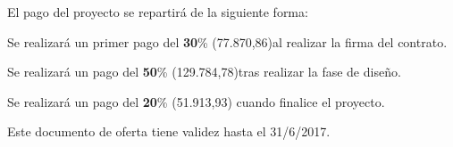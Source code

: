 \par El pago del proyecto se repartirá de la siguiente forma:
\item Se realizará un primer pago del \textbf{30}\% (77.870,86)al realizar la firma del contrato.
\item Se realizará un pago del \textbf{50}\% (129.784,78)tras realizar la fase de diseño.
\item Se realizará un pago del \textbf{20}\% (51.913,93) cuando finalice el proyecto.

\par Este documento de oferta tiene validez hasta el 31/6/2017.
